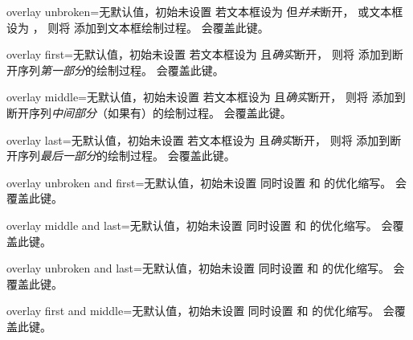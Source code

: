 \begin{docTcbKey}{overlay unbroken}{=}{无默认值，初始未设置}
  若文本框设为  但\emph{并未}断开，
  或文本框设为 ，
  则将  添加到文本框绘制过程。
   会覆盖此键。
\end{docTcbKey}

\begin{docTcbKey}{overlay first}{=}{无默认值，初始未设置}
  若文本框设为  且\emph{确实}断开，
  则将  添加到断开序列\emph{第一部分}的绘制过程。
   会覆盖此键。
\end{docTcbKey}

\begin{docTcbKey}{overlay middle}{=}{无默认值，初始未设置}
  若文本框设为  且\emph{确实}断开，
  则将  添加到断开序列\emph{中间部分}（如果有）的绘制过程。
   会覆盖此键。
\end{docTcbKey}

\begin{docTcbKey}{overlay last}{=}{无默认值，初始未设置}
  若文本框设为  且\emph{确实}断开，
  则将  添加到断开序列\emph{最后一部分}的绘制过程。
   会覆盖此键。
\end{docTcbKey}

\begin{docTcbKey}{overlay unbroken and first}{=}{无默认值，初始未设置}
  同时设置  和  的优化缩写。
   会覆盖此键。
\end{docTcbKey}

\begin{docTcbKey}{overlay middle and last}{=}{无默认值，初始未设置}
  同时设置  和  的优化缩写。
   会覆盖此键。
\end{docTcbKey}

\begin{docTcbKey}{overlay unbroken and last}{=}{无默认值，初始未设置}
  同时设置  和  的优化缩写。
   会覆盖此键。
\end{docTcbKey}

\begin{docTcbKey}[][doc new=2014-09-19]{overlay first and middle}{=}{无默认值，初始未设置}
  同时设置  和  的优化缩写。
   会覆盖此键。
\end{docTcbKey}


